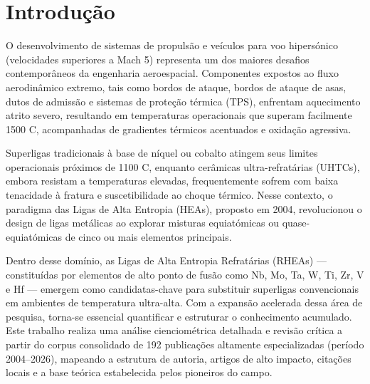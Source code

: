 \section{Introdução}\label{sec:introducao}

O desenvolvimento de sistemas de propulsão e veículos para voo hipersónico (velocidades superiores a Mach 5) representa um dos maiores desafios contemporâneos da engenharia aeroespacial. Componentes expostos ao fluxo aerodinâmico extremo, tais como bordos de ataque, bordos de ataque de asas, dutos de admissão e sistemas de proteção térmica (TPS), enfrentam aquecimento atrito severo, resultando em temperaturas operacionais que superam facilmente 1500 \textdegree{}C, acompanhadas de gradientes térmicos acentuados e oxidação agressiva.

Superligas tradicionais à base de níquel ou cobalto atingem seus limites operacionais próximos de 1100 \textdegree{}C, enquanto cerâmicas ultra-refratárias (UHTCs), embora resistam a temperaturas elevadas, frequentemente sofrem com baixa tenacidade à fratura e suscetibilidade ao choque térmico. Nesse contexto, o paradigma das Ligas de Alta Entropia (HEAs), proposto em 2004, revolucionou o design de ligas metálicas ao explorar misturas equiatómicas ou quase-equiatómicas de cinco ou mais elementos principais.

Dentro desse domínio, as Ligas de Alta Entropia Refratárias (RHEAs) --- constituídas por elementos de alto ponto de fusão como Nb, Mo, Ta, W, Ti, Zr, V e Hf --- emergem como candidatas-chave para substituir superligas convencionais em ambientes de temperatura ultra-alta. Com a expansão acelerada dessa área de pesquisa, torna-se essencial quantificar e estruturar o conhecimento acumulado. Este trabalho realiza uma análise cienciométrica detalhada e revisão crítica a partir do corpus consolidado de 192 publicações altamente especializadas (período 2004--2026), mapeando a estrutura de autoria, artigos de alto impacto, citações locais e a base teórica estabelecida pelos pioneiros do campo.
